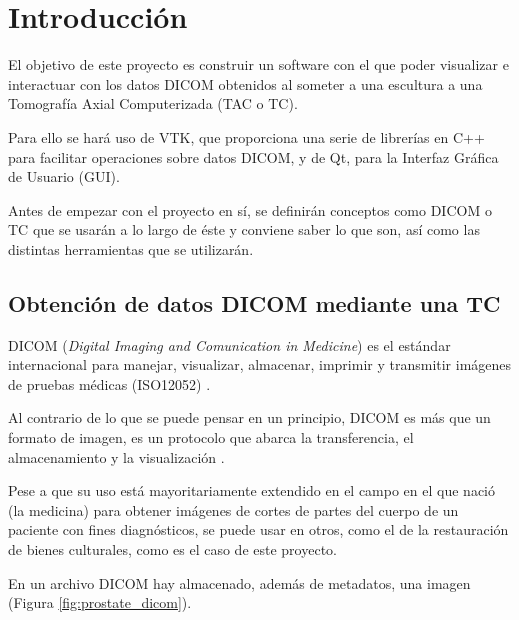 \chapter{Introducción}

El objetivo de este proyecto es construir un software con el que poder visualizar e interactuar con los datos DICOM obtenidos al someter a una escultura a una Tomografía Axial Computerizada (TAC o TC). 

Para ello se hará uso de VTK, que proporciona una serie de librerías en C++ para facilitar operaciones sobre datos DICOM, y de Qt, para la Interfaz Gráfica de Usuario (GUI).

Antes de empezar con el proyecto en sí, se definirán conceptos como DICOM o TC que se usarán a lo largo de éste y conviene saber lo que son, así como las distintas herramientas que se utilizarán.

\section{Obtención de datos DICOM mediante una TC}

DICOM (\textit{Digital Imaging and Comunication in Medicine}) es el estándar internacional para manejar, visualizar, almacenar, imprimir y transmitir imágenes de pruebas médicas (ISO12052) \cite{about_dicom}. 

Al contrario de lo que se puede pensar en un principio, DICOM es más que un formato de imagen, es un protocolo que abarca la transferencia, el almacenamiento y la visualización \cite{dicom_intro_and_guide}.

Pese a que su uso está mayoritariamente extendido en el campo en el que nació (la medicina) para obtener imágenes de cortes de partes del cuerpo de un paciente con fines diagnósticos, se puede usar en otros, como el de la restauración de bienes culturales, como es el caso de este proyecto.

En un archivo DICOM hay almacenado, además de metadatos, una imagen \cite{dicom_classes_vtk} (Figura \ref{fig:prostate_dicom}).

